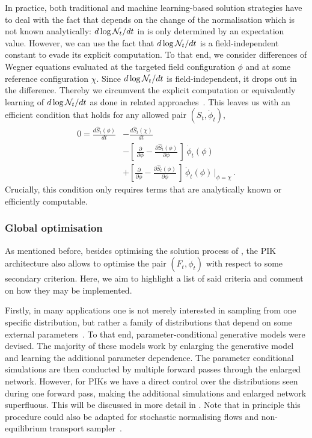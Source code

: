 \documentclass[reprint,amsmath,amssymb,aps,pra,superscriptaddress,nofootinbib,twocolumn,floatfix,nolongbibliography]{revtex4-2}
\begin{document}
In practice, both traditional and machine learning-based solution strategies have to deal with the fact that  depends on the change of the normalisation which is not known analytically: $d \log {\cal N}_t/dt$ in  is only determined by an expectation value. However, we can use the fact that $d \log {\cal N}_t/dt$ is a field-independent constant to evade its explicit computation. To that end, we consider differences of Wegner equations  evaluated at the targeted field configuration $\phi$ and at some reference configuration $\chi$. Since $d \log {\cal N}_t/dt$ is field-independent, it drops out in the difference. Thereby we circumvent the explicit computation or equivalently learning of $d \log {\cal N}_t/dt$ as done in related approaches~\cite{Mate:2023fxa,Albergo:2025nets}. This leaves us with an efficient condition that holds for any allowed pair $(S_t, \dot{\phi}_t)$,
%
\begin{align}\nonumber 
    0 =  \frac{d \hat{S}_t(\phi)}{dt} &- \frac{d \hat{S}_t(\chi)}{dt} \\[1ex]
    &- \left[\,\frac{\partial}{\partial \phi} - \frac{\partial \hat{S}_t(\phi)}{\partial \phi} \, \right] \, \dot{\phi}_t(\phi) \nonumber \\[1ex] 
    &+ \left[\frac{\partial}{\partial \phi} - \frac{\partial \hat{S}_t(\phi)}{\partial \phi} \,\right] \, \dot{\phi}_t(\phi)\, \Big|_{\phi=\chi}\,. 
    \label{eq:OptimizationCondition}
\end{align}
%
Crucially, this condition only requires terms that are analytically known or efficiently computable.


\subsubsection{Global optimisation}
\label{sec:OptimisationPair}

As mentioned before, besides optimising the solution process of , the PIK architecture also allows to optimise the pair $(F_t, \dot{\phi}_t)$ with respect to some secondary criterion. Here, we aim to highlight a list of said criteria and comment on how they may be implemented.

Firstly, in many applications one is not merely interested in sampling from one specific distribution, but rather a family of distributions that depend on some external parameters~\cite{Zhu:2024kiu,Winkler:2023lcf,Ardizzone:2019fwy,Gerdes:2022eve,Singha:2022icw,Wahl:2024trade}. To that end, parameter-conditional generative models were devised. The majority of these models work by enlarging the generative model and learning the additional parameter dependence. The parameter conditional simulations are then conducted by multiple forward passes through the enlarged network. However, for PIKs we have a direct control over the distributions seen during one forward pass, making the additional simulations and enlarged network superfluous. This will be discussed in more detail in . Note that in principle this procedure could also be adapted for stochastic normalising flows and non-equilibrium transport sampler~\cite{Wu:2020snf,Albergo:2025nets}.
\end{document}
